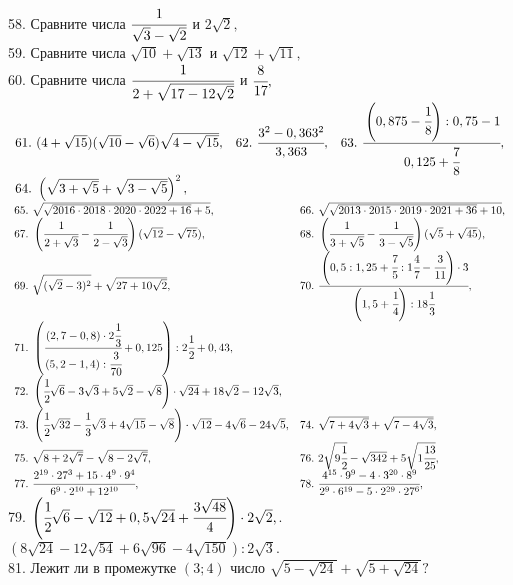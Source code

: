 58. Сравните числа $\cfrac{1}{\sqrt{3}-\sqrt{2}}$ и $2\sqrt{2},$\\
59. Сравните числа $\sqrt{10}+\sqrt{13}$ и $\sqrt{12}+\sqrt{11},$\\
60. Сравните числа $\cfrac{1}{2+\sqrt{17-12\sqrt{2}}}$ и $\cfrac{8}{17},$\\
$\begin{array}{lll}
61.\ (4+\sqrt{15})(\sqrt{10}-\sqrt{6})\sqrt{4-\sqrt{15}},&
62.\ \cfrac{3^2-0,363^2}{3,363},&
63.\ \cfrac{\left(0,875-\cfrac{1}{8}\right):0,75-1}{0,125+\cfrac{7}{8}},\\
64.\ \left(\sqrt{3+\sqrt{5}}+\sqrt{3-\sqrt{5}}\right)^2,
\end{array}$\\
$\begin{array}{ll}
65.\ \sqrt{\sqrt{2016\cdot2018\cdot2020\cdot2022+16}+5},&
66.\ \sqrt{\sqrt{2013\cdot2015\cdot2019\cdot2021+36}+10},\\
67.\ \left(\cfrac{1}{2+\sqrt{3}}-\cfrac{1}{2-\sqrt{3}}\right)(\sqrt{12}-\sqrt{75}),&
68.\ \left(\cfrac{1}{3+\sqrt{5}}-\cfrac{1}{3-\sqrt{5}}\right)(\sqrt{5}+\sqrt{45}),\\
69.\ \sqrt{(\sqrt{2}-3)^2}+\sqrt{27+10\sqrt{2}},&
70.\ \cfrac{\left(0,5:1,25+\cfrac{7}{5}:1\cfrac{4}{7}-\cfrac{3}{11}\right)\cdot3}{\left(1,5+\cfrac{1}{4}\right):18\cfrac{1}{3}},\\
71.\ \left(\cfrac{(2,7-0,8)\cdot2\cfrac{1}{3}}{(5,2-1,4):\cfrac{3}{70}}+0,125\right):2\cfrac{1}{2}+0,43,\\
72.\ \left(\cfrac{1}{2}\sqrt{6}-3\sqrt{3}+5\sqrt{2}-\sqrt{8}\right)\cdot\sqrt{24}+18\sqrt{2}-12\sqrt{3},\\
73.\ \left(\cfrac{1}{2}\sqrt{32}-\cfrac{1}{3}\sqrt{3}+4\sqrt{15}-\sqrt{8}\right)\cdot\sqrt{12}-4\sqrt{6}-24\sqrt{5},&
74.\ \sqrt{7+4\sqrt{3}}+\sqrt{7-4\sqrt{3}},\\
75.\ \sqrt{8+2\sqrt{7}}-\sqrt{8-2\sqrt{7}},&
76.\ 2\sqrt{9\cfrac{1}{2}}-\sqrt{342}+5\sqrt{1\cfrac{13}{25}},\\
77.\ \cfrac{2^{19}\cdot27^3+15\cdot4^9\cdot9^4}{6^9\cdot2^{10}+12^{10}},&
78.\ \cfrac{4^{15}\cdot9^9-4\cdot3^{20}\cdot8^9}{2^9\cdot6^{19}-5\cdot2^{29}\cdot27^6},\end{array}$\\
79. $\left(\cfrac{1}{2}\sqrt{6}-\sqrt{12}+0,5\sqrt{24}+\cfrac{3\sqrt{48}}{4}\right)\cdot2\sqrt{2},$. $(8\sqrt{24}-12\sqrt{54}+6\sqrt{96}-4\sqrt{150}):2\sqrt{3}.$\\
81. Лежит ли в промежутке $(3;4)$ число $\sqrt{5-\sqrt{24}}+\sqrt{5+\sqrt{24}}?$\\
